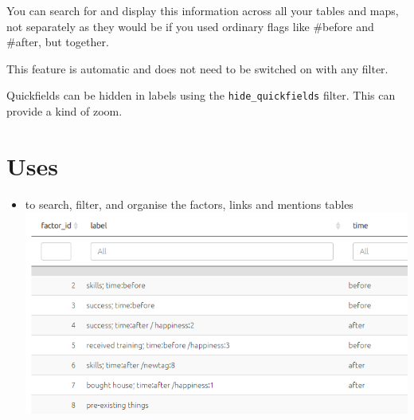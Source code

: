 \documentclass[
]{book}
\providecommand{\tightlist}{%
  \setlength{\itemsep}{0pt}\setlength{\parskip}{0pt}}
\begin{document}
You can search for and display this information across all your tables and maps, not separately as they would be if you used ordinary flags like \#before and \#after, but together.

This feature is automatic and does not need to be switched on with any filter.

Quickfields can be hidden in labels using the \texttt{hide\_quickfields} filter. This can provide a kind of zoom.

\hypertarget{uses}{%
\section{Uses}\label{uses}}

\begin{itemize}
\tightlist
\item
  to search, filter, and organise the factors, links and mentions tables \includegraphics{_assets/image-20220124101850661.png}


\end{itemize}
\end{document}
